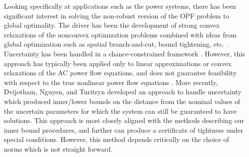 Looking specifically at applications such as the power systems, there has been significant interest in solving the non-robust version of the OPF problem to global optimality.
The driver has been the development of strong convex relaxations of the nonconvex optimization problems combined with ideas from global optimization such as spatial branch-and-cut, bound tightening, etc.~\cite{BiMu2016,coffrin2015strengthening}.
Uncertainty has been handled in a chance-constrained framework \cite{BiChHa2014,zhang2011chance}.
However, this approach has typically been applied only to linear approximations or convex relaxations of the AC power flow equations, and does not guarantee feasibility with respect to the true nonlinear power flow equations \cite{BiChHa2014,kocuk2016strong,RoVrOlAn2015,TsBiTa2016}.
More recently, Dvijotham, Nguyen, and Turitsyn \cite{DjTuritsyn} developed an approach to handle uncertainty which produced inner/lower bounds on the distance from the nominal values of the uncertain parameters for which the system can still be guaranteed to have solutions.
This approach is most closely aligned with the methods describing our inner bound procedures, and further can produce a certificate of tightness under special conditions. 
However, this method depends critically on the choice of norms which is not  straight forward.


